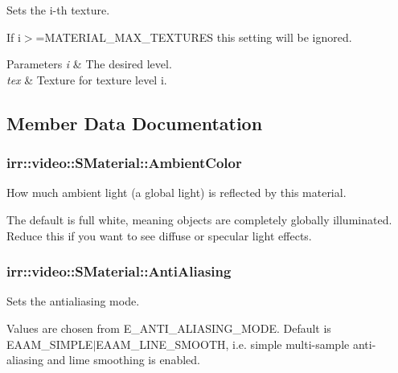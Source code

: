 Sets the i-\/th texture. 

If i$>$=M\+A\+T\+E\+R\+I\+A\+L\+\_\+\+M\+A\+X\+\_\+\+T\+E\+X\+T\+U\+R\+ES this setting will be ignored. 
\begin{DoxyParams}{Parameters}
{\em i} & The desired level. \\
\hline
{\em tex} & Texture for texture level i. \\
\hline
\end{DoxyParams}


\subsection{Member Data Documentation}
\subsubsection[{\texorpdfstring{Ambient\+Color}{AmbientColor}}]{ irr\+::video\+::\+S\+Material\+::\+Ambient\+Color}\hypertarget{classirr_1_1video_1_1SMaterial_a434c189b7c618c66f4d09118d30e6b4b}{}\label{classirr_1_1video_1_1SMaterial_a434c189b7c618c66f4d09118d30e6b4b}


How much ambient light (a global light) is reflected by this material. 

The default is full white, meaning objects are completely globally illuminated. Reduce this if you want to see diffuse or specular light effects. 
\subsubsection[{\texorpdfstring{Anti\+Aliasing}{AntiAliasing}}]{ irr\+::video\+::\+S\+Material\+::\+Anti\+Aliasing}\hypertarget{classirr_1_1video_1_1SMaterial_a8f42b43ebf214c502e6758b9b608c095}{}\label{classirr_1_1video_1_1SMaterial_a8f42b43ebf214c502e6758b9b608c095}


Sets the antialiasing mode. 

Values are chosen from E\+\_\+\+A\+N\+T\+I\+\_\+\+A\+L\+I\+A\+S\+I\+N\+G\+\_\+\+M\+O\+DE. Default is E\+A\+A\+M\+\_\+\+S\+I\+M\+P\+L\+E$\vert$\+E\+A\+A\+M\+\_\+\+L\+I\+N\+E\+\_\+\+S\+M\+O\+O\+TH, i.\+e. simple multi-\/sample anti-\/aliasing and lime smoothing is enabled. 
